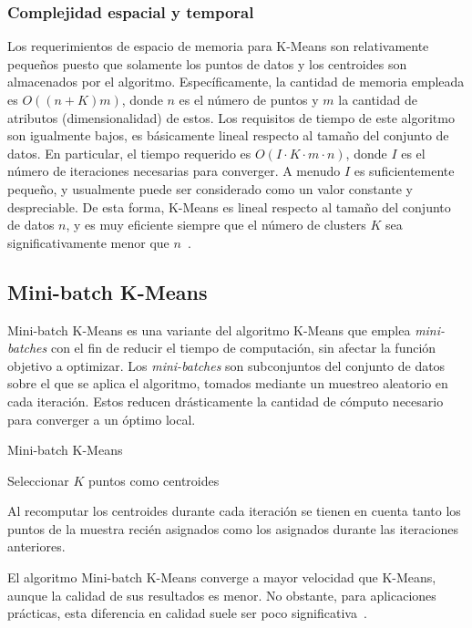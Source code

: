 \subsubsection{Complejidad espacial y temporal}

Los requerimientos de espacio de memoria para K-Means son relativamente pequeños puesto que solamente los puntos de datos y los centroides son almacenados por el algoritmo.
Específicamente, la cantidad de memoria empleada es $O((n+K)m)$, donde $n$ es el número de puntos y $m$ la cantidad de atributos (dimensionalidad) de estos.
Los requisitos de tiempo de este algoritmo son igualmente bajos, es básicamente lineal respecto al tamaño del conjunto de datos.
En particular, el tiempo requerido es $O(I \cdot K \cdot m \cdot n)$, donde $I$ es el número de iteraciones necesarias para converger.
A menudo $I$ es suficientemente pequeño, y usualmente puede ser considerado como un valor constante y despreciable.
De esta forma, K-Means es lineal respecto al tamaño del conjunto de datos $n$, y es muy eficiente siempre que el número de clusters $K$ sea significativamente menor que $n$~\cite{Tan05}.

\subsection{Mini-batch K-Means}\label{subsec:miniBatchKMeans}

Mini-batch K-Means es una variante del algoritmo K-Means que emplea \textit{mini-batches} con el fin de reducir el tiempo de computación, sin afectar la función objetivo a optimizar.
Los \textit{mini-batches} son subconjuntos del conjunto de datos sobre el que se aplica el algoritmo, tomados mediante un muestreo aleatorio en cada iteración.
Estos reducen drásticamente la cantidad de cómputo necesario para converger a un óptimo local.

\begin{algorithm}
    \caption{Mini-batch K-Means}
    \label{algorithm:MiniBatchKMeans}
    Seleccionar $K$ puntos como centroides\;
\end{algorithm}

Al recomputar los centroides durante cada iteración se tienen en cuenta tanto los puntos de la muestra recién asignados como los asignados durante las iteraciones anteriores.

El algoritmo Mini-batch K-Means converge a mayor velocidad que K-Means, aunque la calidad de sus resultados es menor.
No obstante, para aplicaciones prácticas, esta diferencia en calidad suele ser poco significativa~\cite{Sculley10}.
